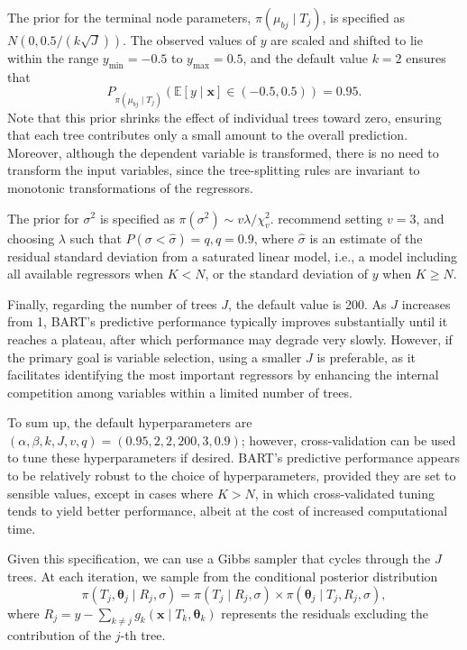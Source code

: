 The prior for the terminal node parameters, \( \pi(\mu_{bj} \mid T_j) \), is specified as \( N(0, 0.5 / (k \sqrt{J})) \). The observed values of \( y \) are scaled and shifted to lie within the range \( y_{\text{min}} = -0.5 \) to \( y_{\text{max}} = 0.5 \), and the default value \( k = 2 \) ensures that  
\[
P_{\pi(\mu_{bj} \mid T_j)}\left(\mathbb{E}[y \mid \mathbf{x}] \in (-0.5, 0.5)\right) = 0.95.
\]
Note that this prior shrinks the effect of individual trees toward zero, ensuring that each tree contributes only a small amount to the overall prediction. Moreover, although the dependent variable is transformed, there is no need to transform the input variables, since the tree-splitting rules are invariant to monotonic transformations of the regressors.

The prior for \( \sigma^2 \) is specified as \( \pi(\sigma^2) \sim v\lambda / \chi^2_v \). \cite{chipman2010bart} recommend setting \( v = 3 \), and choosing \( \lambda \) such that \( P(\sigma < \hat{\sigma}) = q, q = 0.9 \), where \( \hat{\sigma} \) is an estimate of the residual standard deviation from a saturated linear model, i.e., a model including all available regressors when \( K < N \), or the standard deviation of \( y \) when \( K \geq N \). 

Finally, regarding the number of trees \( J \), the default value is 200. As \( J \) increases from 1, BART’s predictive performance typically improves substantially until it reaches a plateau, after which performance may degrade very slowly. However, if the primary goal is variable selection, using a smaller \( J \) is preferable, as it facilitates identifying the most important regressors by enhancing the internal competition among variables within a limited number of trees.

To sum up, the default hyperparameters are \( (\alpha, \beta, k, J, v, q) = (0.95, 2, 2, 200, 3, 0.9) \); however, cross-validation can be used to tune these hyperparameters if desired. BART's predictive performance appears to be relatively robust to the choice of hyperparameters, provided they are set to sensible values, except in cases where \( K > N \), in which cross-validated tuning tends to yield better performance, albeit at the cost of increased computational time.

Given this specification, we can use a Gibbs sampler that cycles through the \( J \) trees. At each iteration, we sample from the conditional posterior distribution
\[
\pi(T_j, \boldsymbol{\theta}_j \mid R_j, \sigma) = \pi(T_j \mid R_j, \sigma) \times \pi(\boldsymbol{\theta}_j \mid T_j, R_j, \sigma),
\]
where \( R_j = y - \sum_{k \neq j} g_k(\mathbf{x} \mid T_k, \boldsymbol{\theta}_k) \) represents the residuals excluding the contribution of the \( j \)-th tree.

